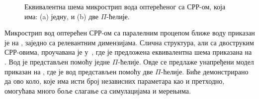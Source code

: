 \begin{figure}[!t]
\centering
{}\hspace{0.3cm}
\caption{Еквивалентна шема микрострип вода оптерећеног са СРР-ом, која има: (a) једну, и (b) две $\Pi$-ћелије.} 
\label{f2}
\end{figure}
Микрострип вод оптерећен СРР-ом са паралелним процепом ближе воду приказан је на , заједно са релевантним димензијама. Слична структура, али са двоструким СРР-овима, проучавана је у~\cite{bib16}, где је предложена еквивалентна шема приказана на . Вод је представљен помоћу једне $\Pi$-ћелије. Овде се предлаже унапређени модел приказан на , где је вод представљен помоћу две $\Pi$-ћелије. Биће демонстрирано да ово коло, које има исти број независних параметара као и претходно, омогућава много боље слагање са симулацијама и мерењима.


